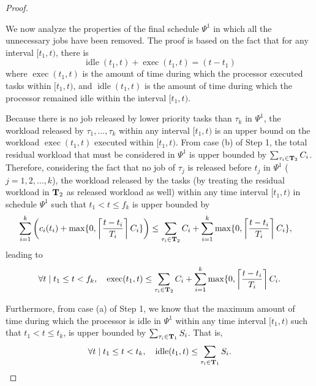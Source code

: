 \begin{proof}
~



We now analyze the properties of the final schedule $\Psi^1$ in which all the unnecessary jobs have been removed. The proof is based on the fact that for any interval $[t_1, t)$, there is 
\begin{equation}
\label{eq:exec_plus_idle}
\operatorname{idle}(t_1, t) + \operatorname{exec}(t_1, t)  = (t - t_1)
\end{equation}
where $\operatorname{exec}(t_1, t)$ is the amount of time during which the processor executed tasks within $[t_1, t)$, and $\operatorname{idle}(t_1, t)$ is the amount of time during which the processor remained idle within the interval $[t_1, t)$.

Because there is no job released by lower priority tasks than $\tau_k$ in $\Psi^1$, the workload released by $\tau_1, \ldots, \tau_k$ within any interval $[t_1, t)$ is an upper bound on the workload $\operatorname{exec}(t_1, t)$ executed within $[t_1, t)$. From case (b) of Step 1, the total residual workload that must be considered in $\Psi^1$ is upper bounded by $\sum_{\tau_i \in {\bf T}_2} C_i$.
Therefore, considering the fact that no job of $\tau_j$ is released before $t_j$ in $\Psi^1$ ($j=1,2,\ldots,k$), the workload released by the tasks (by treating the residual workload in ${\bf T}_2$ as released workload as well) within any time interval $[t_1, t)$ in schedule $\Psi^1$ such that $t_1 < t \leq f_k$ is upper bounded by 
\begin{align*}
\sum_{i=1}^k \left( c_i(t_i) + \max\{0, \left\lceil{\frac{t- t_i}{T_i} }\right\rceil C_i \} \right) & \leq \sum_{\tau_i \in {\bf T}_2} C_i + \sum_{i=1}^k \max\{0, \left\lceil{\frac{t- t_i}{T_i} }\right\rceil C_i \},
\end{align*}
leading to 
\begin{equation}
\label{eq:exec_time}
\forall t \mid t_1 \leq t < f_k,\quad \operatorname{exec}(t_1, t) \leq \sum_{\tau_i \in {\bf T}_2} C_i + \sum_{i=1}^k \max\{0, \left\lceil{\frac{t- t_i}{T_i} }\right\rceil C_i.
\end{equation}

Furthermore, from case (a) of Step 1, we know that the maximum amount of time during which the processor is idle in $\Psi^1$ within any time interval $[t_1, t)$ such that $t_1 < t \leq t_k$, is upper bounded by $\sum_{\tau_i \in {\bf T}_1} S_i$. That is,
\begin{equation}
\label{eq:idle_time}
\forall t \mid t_1 \leq t < t_k,\quad \operatorname{idle}(t_1, t) \leq \sum_{\tau_i \in {\bf T}_1} S_i.
\end{equation}


\end{proof}
